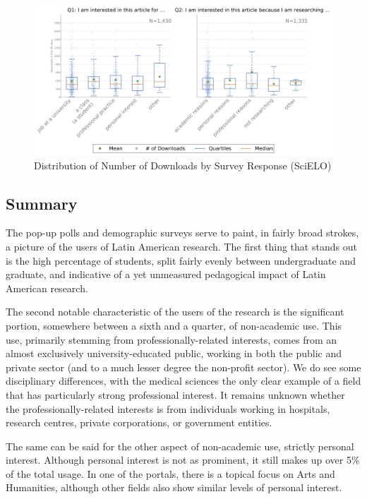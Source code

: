 \begin{figure}[htbp]
\centering
\includegraphics[keepaspectratio,width=\textwidth,height=0.75\textheight]{figures/downloads90_by_q1_q2_scielo.png}
\caption{Distribution of Number of Downloads by Survey Response (SciELO)}
\label{downloads90_by_q1_q2_scielo}
\end{figure}

\subsection{Summary}
\label{summary}

The pop-up polls and demographic surveys serve to paint, in fairly broad strokes, a picture of the users of Latin American research. The first thing that stands out is the high percentage of students, split fairly evenly between undergraduate and graduate, and indicative of a yet unmeasured pedagogical impact of Latin American research.

The second notable characteristic of the users of the research is the significant portion, somewhere between a sixth and a quarter, of non-academic use. This use, primarily stemming from professionally-related interests, comes from an almost exclusively university-educated public, working in both the public and private sector (and to a much lesser degree the non-profit sector). We do see some disciplinary differences, with the medical sciences the only clear example of a field that has particularly strong professional interest. It remains unknown whether the professionally-related interests is from individuals working in hospitals, research centres, private corporations, or government entities.

The same can be said for the other aspect of non-academic use, strictly personal interest. Although personal interest is not as prominent, it still makes up over 5\% of the total usage. In one of the portals, there is a topical focus on Arts and Humanities, although other fields also show similar levels of personal interest.

